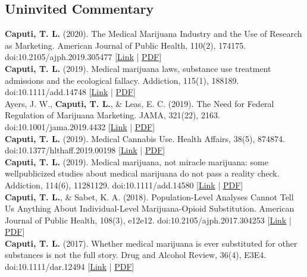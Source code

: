 \subsection*{Uninvited Commentary}\noindent
{}\textbf{Caputi, T. L.} (2020). The Medical Marijuana Industry and the Use of Research as Marketing. American Journal of Public Health, 110(2), 174175. doi:10.2105/ajph.2019.305477 [\href{https://ajph.aphapublications.org/doi/10.2105/AJPH.2019.305477}{Link} | \href{https://www.theodorecaputi.com/files/AJPH-2020.pdf}{PDF}] \\[.2cm]
\textbf{Caputi, T. L.} (2019). Medical marijuana laws, substance use treatment admissions and the ecological fallacy. Addiction, 115(1), 188189. doi:10.1111/add.14748 [\href{https://onlinelibrary.wiley.com/doi/full/10.1111/add.14748}{Link} | \href{https://www.theodorecaputi.com/files/ADD-2020.pdf}{PDF}] \\[.2cm]
Ayers, J. W., \textbf{Caputi, T. L.}, & Leas, E. C. (2019). The Need for Federal Regulation of Marijuana Marketing. JAMA, 321(22), 2163. doi:10.1001/jama.2019.4432 [\href{https://jamanetwork.com/journals/jama/article-abstract/2734209}{Link} | \href{https://www.theodorecaputi.com/files/JAMA-2019.pdf}{PDF}] \\[.2cm]
\textbf{Caputi, T. L.} (2019). Medical Cannabis Use. Health Affairs, 38(5), 874874. doi:10.1377/hlthaff.2019.00198 [\href{https://www.healthaffairs.org/doi/10.1377/hlthaff.2019.00198}{Link} | \href{https://www.theodorecaputi.com/files/HA-2019.pdf}{PDF}] \\[.2cm]
\textbf{Caputi, T. L.} (2019). Medical marijuana, not miracle marijuana: some wellpublicized studies about medical marijuana do not pass a reality check. Addiction, 114(6), 11281129. doi:10.1111/add.14580 [\href{https://onlinelibrary.wiley.com/doi/full/10.1111/add.14580}{Link} | \href{https://www.theodorecaputi.com/files/ADD-2019.pdf}{PDF}] \\[.2cm]
\textbf{Caputi, T. L.}, & Sabet, K. A. (2018). Population-Level Analyses Cannot Tell Us Anything About Individual-Level Marijuana-Opioid Substitution. American Journal of Public Health, 108(3), e12e12. doi:10.2105/ajph.2017.304253 [\href{https://ajph.aphapublications.org/doi/10.2105/AJPH.2017.304253}{Link} | \href{https://www.theodorecaputi.com/files/AJPH_letter-2018.pdf}{PDF}] \\[.2cm]
\textbf{Caputi, T. L.} (2017). Whether medical marijuana is ever substituted for other substances is not the full story. Drug and Alcohol Review, 36(4), E3E4. doi:10.1111/dar.12494 [\href{https://onlinelibrary.wiley.com/doi/abs/10.1111/dar.12494}{Link} | \href{https://www.theodorecaputi.com/files/DAR-2017.pdf}{PDF}] \\[.2cm]
